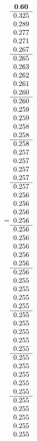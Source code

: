 =\hbox{$\begin{array}{c}
\bf 0.60 
 \\ \hline 
   0.325 \\ 
   0.289 \\ 
   0.277 \\ 
   0.271 \\ 
   0.267
 \\ \hline 
   0.265 \\ 
   0.263 \\ 
   0.262 \\ 
   0.261 \\ 
   0.260
 \\ \hline 
   0.260 \\ 
   0.259 \\ 
   0.259 \\ 
   0.258 \\ 
   0.258
 \\ \hline 
   0.258 \\ 
   0.257 \\ 
   0.257 \\ 
   0.257 \\ 
   0.257
 \\ \hline 
   0.257 \\ 
   0.256 \\ 
   0.256 \\ 
   0.256 \\ 
   0.256
 \\ \hline 
   0.256 \\ 
   0.256 \\ 
   0.256 \\ 
   0.256 \\ 
   0.256
 \\ \hline 
   0.256 \\ 
   0.255 \\ 
   0.255 \\ 
   0.255 \\ 
   0.255
 \\ \hline 
   0.255 \\ 
   0.255 \\ 
   0.255 \\ 
   0.255 \\ 
   0.255
 \\ \hline 
   0.255 \\ 
   0.255 \\ 
   0.255 \\ 
   0.255 \\ 
   0.255
 \\ \hline 
   0.255 \\ 
   0.255 \\ 
   0.255 \\ 
   0.255 \\ 
   0.255
 \end{array}$}
